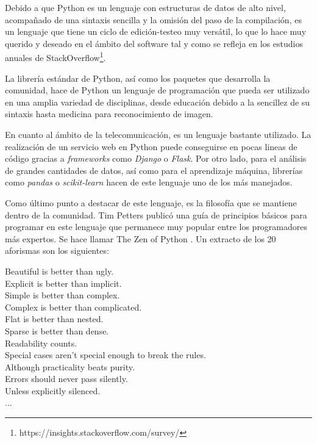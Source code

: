 \documentclass[a4paper, 12pt]{book}
\begin{document}
Debido a que Python es un lenguaje con estructuras de datos de alto nivel, acompañado de una sintaxis sencilla y la omisión del paso de la compilación, es un lenguaje que tiene un ciclo de edición-testeo muy versátil, lo que lo hace muy querido y deseado en el ámbito del software tal y como se refleja en los estudios anuales de StackOverflow\footnote{https://insights.stackoverflow.com/survey/}.

La librería estándar de Python, así como los paquetes que desarrolla la comunidad, hace de Python un lenguaje de programación que pueda ser utilizado en una amplia variedad de disciplinas, desde educación debido a la sencillez de su sintaxis hasta medicina para reconocimiento de imagen.

En cuanto al ámbito de la telecomunicación, es un lenguaje bastante utilizado. La realización de un servicio web en Python puede conseguirse en pocas lineas de código gracias a \textit{frameworks} como \textit{Django} o \textit{Flask}. Por otro lado, para el análisis de grandes cantidades de datos, así como para el aprendizaje máquina, librerías como \textit{pandas} o \textit{scikit-learn} hacen de este lenguaje uno de los más manejados.

Como último punto a destacar de este lenguaje, es la filosofía que se mantiene dentro de la comunidad. Tim Petters publicó una guía de principios básicos para programar en este lenguaje que permanece muy popular entre los programadores más expertos. Se hace llamar The Zen of Python \cite{peters2010zen}. Un extracto de los 20 aforismas son los siguientes:\\
\begin{itshape}
Beautiful is better than ugly.\\
Explicit is better than implicit.\\
Simple is better than complex.\\
Complex is better than complicated. \\
Flat is better than nested. \\
Sparse is better than dense. \\
Readability counts. \\
Special cases aren't special enough to break the rules. \\
Although practicality beats purity. \\
Errors should never pass silently. \\
Unless explicitly silenced. \\
... \\
\end{itshape}
\end{document}

